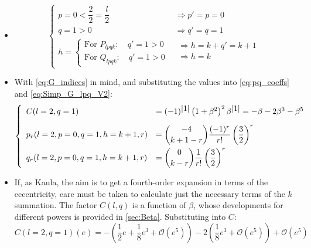 \begin{itemize}
			\item[\GMVred{Step 2. }] 
			\begin{equation}
			\left\{ \begin{array}{ll}
			p = 0 < \dfrac{2}{2} =\dfrac{l}{2} &  \Rightarrow p' = p = 0\\[1em]
			q= 1 >0  &  \Rightarrow q' = q = 1\\[1em]
			h = \left\{\begin{array}{l}
			\text{For } P_{lpqk}: \quad q' = 1>0 \\
			\text{For } Q_{lpqk}: \quad q' = 1>0 \end{array}\right.
			& \begin{array}{l}
			\Rightarrow h = k + q' = k + 1\\
			\Rightarrow h = k \\		
			\end{array}
			\end{array}\right.
			\label{eq:G_indices}
			\end{equation}
			\item[\GMVred{Step 3. }]  With \eqref{eq:G_indices} in mind, and substituting the values into \eqref{eq:pq_coeffs} and \eqref{eq:Simp_G_lpq_V2}:
			\begin{equation}
			\left\{ \begin{array}{ll}
			C(l= 2, q=1) 	 & = (-1)^{\mbox{$\left\lvert 1 \right\rvert$}}\left( 1 + \beta^2\right)^2 \beta^{\mbox{$\left\lvert 1 \right\rvert$}} = -\beta - 2\beta^3 - \beta^5 \\[1em]
			p_r(l = 2, p = 0, q = 1, h = k+1, r) 		 & =  \dbinom{-4}{k + 1 - r} \dfrac{(-1)^r}{r!} \left( \dfrac{3}{2}\right)^r\\[1em]
			q_r(l = 2, p = 0, q = 1, h = k+1, r) 		 & =  \dbinom{0}{k - r} \dfrac{1}{r!} \left( \dfrac{3}{2}\right)^r\\
			\end{array}\right.
			\end{equation}
			\item[\GMVred{Step 4. }]  If, as Kaula, the aim is to get a fourth-order expansion in terms of the eccentricity, care must be taken to calculate just the necessary terms of the $k$ summation. The factor $C(l, q)$ is a function of $\beta$, whose developments for different powers is provided in \ref{sec:Beta}. Substituting into $C$:
			\[
			C(l = 2, q=1)(e) = - \left(\dfrac{1}{2}e + \dfrac{1}{8}e^3 + \mathcal{O}(e^5)\right) - 2 \left(\dfrac{1}{8} e^3 +\mathcal{O}(e^5)\right) + \mathcal{O}(e^5)
\]
\end{itemize}
